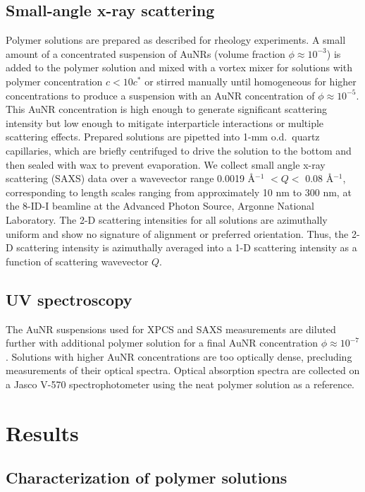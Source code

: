 \documentclass[journal=jacsat, superscriptaddress]{achemso}
\def\EDITS#1{{\color{black}#1}}
\def\EDITS#1{#1}
\begin{document}
\subsection{\small Small-angle x-ray scattering }

Polymer solutions are prepared as described for rheology experiments. A small amount of a concentrated suspension of AuNRs (volume fraction $\phi \approx 10^{-3}$) is added to the polymer solution and mixed with a vortex mixer for solutions with polymer concentration $c < 10c^*$ or stirred manually until homogeneous for higher concentrations to produce a suspension with an AuNR concentration of $\phi \approx 10^{-5}$. This AuNR concentration is high enough to generate significant scattering intensity but low enough to mitigate interparticle interactions or multiple scattering effects. Prepared solutions are pipetted into 1-mm o.d.\ quartz capillaries, which are briefly centrifuged to drive the solution to the bottom and then sealed with wax to prevent evaporation. We collect small angle x-ray scattering (SAXS) data over a wavevector range 0.0019 \AA$^{-1}$ $< Q <$ 0.08 {\AA}$^{-1}$, corresponding to length scales ranging from approximately 10 nm to 300 nm, at the 8-ID-I beamline at the Advanced Photon Source, Argonne National Laboratory. \EDITS{The 2-D scattering intensities for all solutions are azimuthally uniform and show no signature of alignment or preferred orientation. Thus, the 2-D scattering intensity is azimuthally averaged into a 1-D scattering intensity as a function of scattering wavevector $Q$.}

\subsection{\small UV spectroscopy}

The AuNR suspensions used for XPCS and SAXS measurements are diluted further with additional polymer solution for a final AuNR concentration $\phi \approx 10^{-7}$. Solutions with higher AuNR concentrations are too optically dense, precluding measurements of their optical spectra. \EDITS{Optical absorption spectra} are collected on a Jasco V-570 spectrophotometer using the neat polymer solution as a reference.

\section{Results}

\subsection{\small Characterization of polymer solutions}
\end{document}
